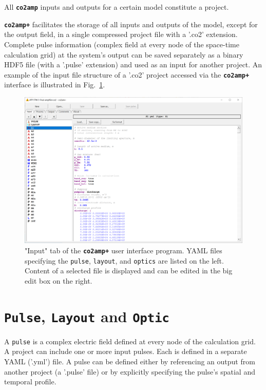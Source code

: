 \documentclass{report}
\begin{document}
All \textbf{\texttt{co2amp}} inputs and outputs for a certain model constitute a project.

\textbf{\texttt{co2amp+}} facilitates the storage of all inputs and outputs of the model, except for the output field, in a single compressed project file with a '.co2' extension. Complete pulse information (complex field at every node of the space-time calculation grid) at the system's output can be saved separately as a binary HDF5 file (with a '.pulse' extension) and used as an input for another project. An example of the input file structure of a '.co2' project accessed via the \textbf{\texttt{co2amp+}} interface is illustrated in Fig.~\ref{fig:gui-input}.

\begin{figure}[ht]
 \centering
 \includegraphics[width=14cm]{images/gui-input}
 \caption{"Input" tab of the \textbf{\texttt{co2amp+}} user interface program. YAML files specifying the \texttt{pulse}, \texttt{layout}, and \texttt{optics} are listed on the left. Content of a selected file is displayed and can be edited in the big edit box on the right.}
 \label{fig:gui-input}
\end{figure}


\section{\texttt{Pulse}, \texttt{Layout} and \texttt{Optic}}
A \texttt{pulse} is a complex electric field defined at every node of the calculation grid. A project can include one or more input pulses. Each is defined in a separate YAML ('.yml') file. A pulse can be defined either by referencing an output from another project (a '.pulse' file) or by explicitly specifying the pulse's spatial and temporal profile.
\end{document}

